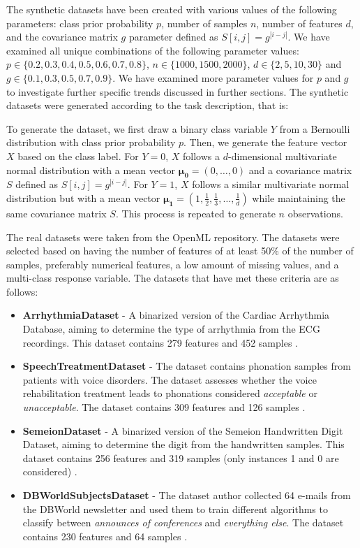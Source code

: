 \documentclass[11pt]{article}
\begin{document}
The synthetic datasets have been created with various values of the following parameters: class prior probability $p$, number of samples $n$, number of features $d$, and the covariance matrix $g$ parameter defined as $S[i,j] = g^{|i-j|}$. We have examined all unique combinations of the following parameter values: $p \in \{0.2, 0.3, 0.4, 0.5, 0.6, 0.7, 0.8\}$, $n \in \{1000, 1500, 2000\}$, $d \in \{2, 5, 10, 30\}$ and $g \in \{0.1, 0.3, 0.5, 0.7, 0.9\}$. We have examined more parameter values for $p$ and $g$ to investigate further specific trends discussed in further sections. The synthetic datasets were generated according to the task description, that is:

To generate the dataset, we first draw a binary class variable $Y$ from a Bernoulli distribution with class prior probability $p$. Then, we generate the feature vector $X$ based on the class label. For $Y = 0$, $X$ follows a $d$-dimensional multivariate normal distribution with a mean vector $\boldsymbol{\mu_0} = (0, \dots, 0)$ and a covariance matrix $S$ defined as $S[i,j] = g^{|i-j|}$. For $Y = 1$, $X$ follows a similar multivariate normal distribution but with a mean vector $\boldsymbol{\mu_1} = \left(1, \frac{1}{2}, \frac{1}{3}, \dots, \frac{1}{d} \right)$ while maintaining the same covariance matrix $S$. This process is repeated to generate $n$ observations.


The real datasets were taken from the OpenML \cite{OpenML2013} repository. The datasets were selected based on having the number of features of at least 50\% of the number of samples, preferably numerical features, a low amount of missing values, and a multi-class response variable. The datasets that have met these criteria are as follows:
\begin{itemize}
    \item \textbf{ArrhythmiaDataset} - A binarized version of the Cardiac Arrhythmia Database, aiming to determine the type of arrhythmia from the ECG recordings. This dataset contains 279 features and 452 samples \cite{arrhythmia_5}.
    \item \textbf{SpeechTreatmentDataset} - The dataset contains phonation samples from patients with voice disorders. The dataset assesses whether the voice rehabilitation treatment leads to phonations considered \textit{acceptable} or \textit{unacceptable}. The dataset contains 309 features and 126 samples \cite{lsvt_voice_rehabilitation_282}.
    
    \item \textbf{SemeionDataset} - A binarized version of the Semeion Handwritten Digit Dataset, aiming to determine the digit from the handwritten samples. This dataset contains 256 features and 319 samples (only instances 1 and 0 are considered) \cite{semeion_handwritten_digit_178}.
    \item \textbf{DBWorldSubjectsDataset} - The dataset author collected 64 e-mails from the DBWorld newsletter and used them to train different algorithms to classify between \textit{announces of conferences} and \textit{everything else}. The dataset contains 230 features and 64 samples \cite{dbworld_e-mails_219}.

\end{itemize}
\end{document}
